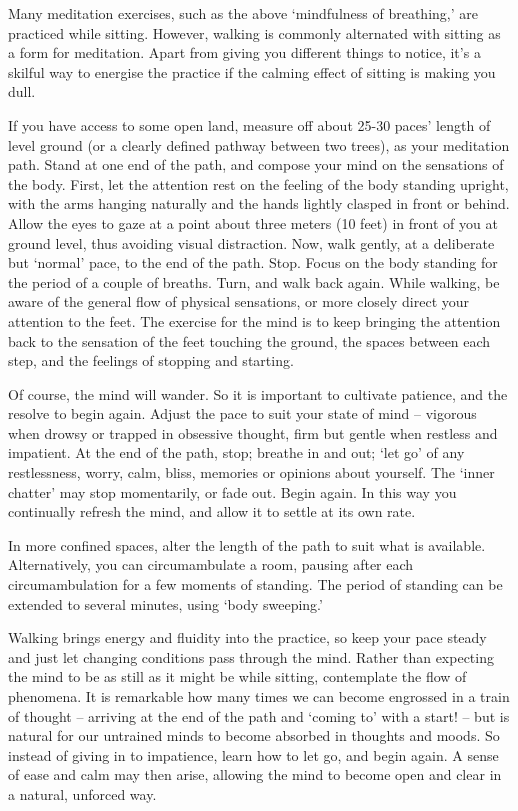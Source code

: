 
Many meditation exercises, such as the above `mindfulness of breathing,'
are practiced while sitting. However, walking is commonly alternated
with sitting as a form for meditation. Apart from giving you different
things to notice, it's a skilful way to energise the practice if the
calming effect of sitting is making you dull.

If you have access to some open land, measure off about 25-30 paces'
length of level ground (or a clearly defined pathway between two trees),
as your meditation path. Stand at one end of the path, and compose your
mind on the sensations of the body. First, let the attention rest on the
feeling of the body standing upright, with the arms hanging naturally
and the hands lightly clasped in front or behind. Allow the eyes to gaze
at a point about three meters (10 feet) in front of you at ground
level, thus avoiding visual distraction. Now, walk gently, at a
deliberate but `normal' pace, to the end of the path. Stop. Focus on the
body standing for the period of a couple of breaths. Turn, and walk back
again. While walking, be aware of the general flow of physical
sensations, or more closely direct your attention to the feet. The
exercise for the mind is to keep bringing the attention back to the
sensation of the feet touching the ground, the spaces between each step,
and the feelings of stopping and starting.

Of course, the mind will wander. So it is important to cultivate
patience, and the resolve to begin again. Adjust the pace to suit your
state of mind -- vigorous when drowsy or trapped in obsessive thought,
firm but gentle when restless and impatient. At the end of the path,
stop; breathe in and out; `let go' of any restlessness, worry, calm,
bliss, memories or opinions about yourself. The `inner chatter' may stop
momentarily, or fade out. Begin again. In this way you continually
refresh the mind, and allow it to settle at its own rate.

\vspace*{-0.5\onelineskip}
In more confined spaces, alter the length of the path to suit what is
available. Alternatively, you can circumambulate a room, pausing after
each circumambulation for a few moments of standing. The period of
standing can be extended to several minutes, using `body sweeping.'

\vspace*{-0.5\onelineskip}
Walking brings energy and fluidity into the practice, so keep your pace
steady and just let changing conditions pass through the mind. Rather
than expecting the mind to be as still as it might be while sitting,
contemplate the flow of phenomena. It is remarkable how many times we
can become engrossed in a train of thought -- arriving at the end of the
path and `coming to' with a start! -- but is natural for our untrained
minds to become absorbed in thoughts and moods. So instead of giving in
to impatience, learn how to let go, and begin again. A sense of ease and
calm may then arise, allowing the mind to become open and clear in a
natural, unforced way.

